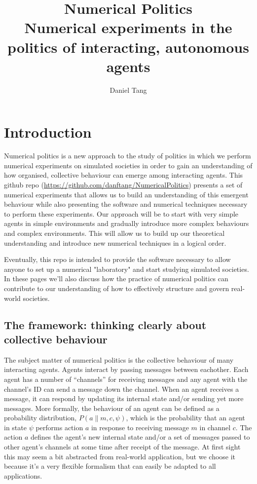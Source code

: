 \documentclass[a4paper]{report}
\title{Numerical Politics\\
	\large Numerical experiments in the politics of interacting, autonomous agents}
\author{Daniel Tang}
\begin{document}
\maketitle
\tableofcontents

\chapter{Introduction}

Numerical politics is a new approach to the study of politics in which we perform numerical experiments on simulated societies in order to gain an understanding of how organised, collective behaviour can emerge among interacting agents. This github repo (\url{https://github.com/danftang/NumericalPolitics}) presents a set of numerical experiments  that allows us to build an understanding of this emergent behaviour while also presenting the software and numerical techniques necessary to perform these experiments. Our approach will be to start with very simple agents in simple environments and gradually introduce more complex behaviours and complex environments. This will allow us to build up our theoretical understanding and introduce new numerical techniques in a logical order.

Eventually, this repo is intended to provide the software necessary to allow anyone to set up a numerical "laboratory" and start studying simulated societies. In these pages we'll also discuss how the practice of numerical politics can contribute to our understanding of how to effectively structure and govern real-world societies.

\section{The framework: thinking clearly about collective behaviour}

The subject matter of numerical politics is the collective behaviour of many interacting agents. Agents interact by passing messages between eachother. Each agent has a number of ``channels'' for receiving messages and any agent with the channel's ID can send a message down the channel. When an agent receives a message, it can respond by updating its internal state and/or sending yet more messages. More formally, the behaviour of an agent can be defined as a probability distribution, $P(a\|m,c,\psi)$, which is the probability that an agent in state $\psi$ performs action $a$ in response to receiving message $m$ in channel $c$. The action $a$ defines the agent's new internal state and/or a set of messages passed to other agent's channels at some time after receipt of the message. At first sight this may seem a bit abstracted from real-world application, but we choose it because it's a very flexible formalism that can easily be adapted to all applications.
\end{document}
